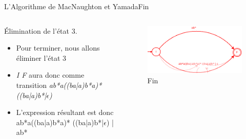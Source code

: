 \documentclass{beamer}
\begin{document}
\begin{frame}{L'Algorithme de MacNaughton et Yamada}{Fin}
        \begin{columns}[T]
     \begin{column}{.48\textwidth}
         {\fontsize{8}{9}\selectfont Élimination de l'état 3.}
         \begin{itemize}
         
             \item {\fontsize{7}{8}\selectfont Pour terminer, nous allons éliminer l'état 3}
             \item {\fontsize{7}{8}\selectfont \textit{I F} aura donc comme transition \textit{ab*a((ba|a)b*a)* ((ba|a)b*|$\epsilon$)}  }
             \item {\fontsize{7}{8}\selectfont L'expression résultant est donc \big{(}ab*a((ba|a)b*a)* ((ba|a)b*|$\epsilon$)\big{)} | ab*} 
             
             
         \end{itemize}
     \end{column}
     
     \begin{column}{.48\textwidth}
     \begin{figure}
     \includegraphics[scale=0.37]{Diagramme5_2.png}
     \centering
     \caption{Fin}     
     \end{figure}
     \end{column}
        
     \end{columns}
\end{frame}

    
\end{document}
